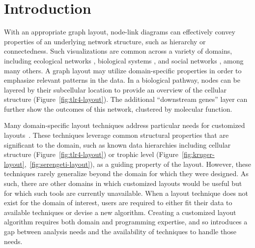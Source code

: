 \section{Introduction}
With an appropriate graph layout, node-link diagrams can
effectively convey properties of an underlying
network structure, such as hierarchy or connectedness. Such visualizations
are common across a variety of domains, including ecological networks
\cite{hinke2004visualizing,harper2006dynamic,lavigne1996cod,baskerville2011spatial,yodzis1998local,cohen2003ecological,kearney2016blog,benson2016higher,kruger2017},
biological systems
\cite{barsky2008cerebral,shannon2003cytoscape,gehlenborg2010visualization,saraiya2005visualizing,becker2001graph,kojima2007efficient,li2005grid},
and social networks
\cite{scott1988social,rothenberg1998using,fitzpatrick2001preventable,mcelroy2003network,fu2011hiv}, 
among many others. A graph layout may utilize
domain-specific properties in order to emphasize relevant patterns in the
data. 
In a biological pathway, nodes can be layered by their
subcellular location to provide an overview of the cellular structure
(Figure~\ref{fig:tlr4-layout}). The additional ``downstream genes'' layer
can further show the outcomes of this network, clustered by molecular function.

\tlrfourLayout

Many domain-specific layout techniques address particular needs
for customized layouts~\cite{barsky2008cerebral,genc2003constrained,shannon2003cytoscape,kearney2017d3,kearney2017ecopath}. These
techniques leverage common structural properties that are significant to the
domain, such as known data hierarchies including cellular 
structure (Figure~\ref{fig:tlr4-layout}) or trophic level
(Figure~\ref{fig:kruger-layout},~\ref{fig:serengeti-layout}), as a guiding property of the
layout. However, these techniques rarely generalize beyond the domain for
which they were designed. As such, there are other domains in which customized 
layouts would be useful but for which such tools are currently unavailable. 
When a layout technique does not exist for the
domain of interest, users are required to either fit their data
to available techniques or devise a new algorithm. Creating a
customized layout algorithm requires both
domain and programming expertise, and so introduces a gap between 
analysis needs and the availability of techniques to
handle those needs.

